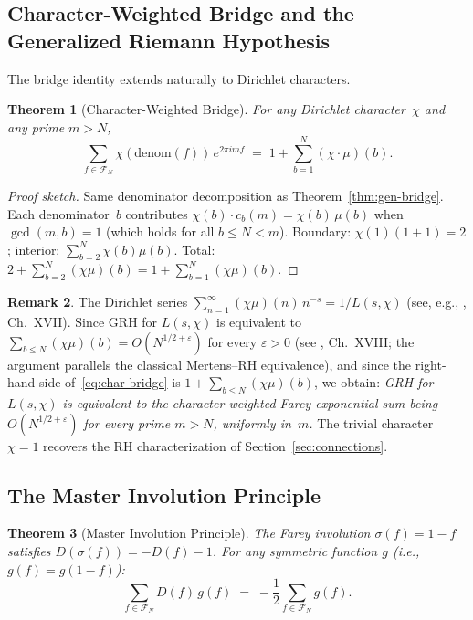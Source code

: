 \documentclass[11pt]{article}
\newtheorem{theorem}{Theorem}[section]
\theoremstyle{definition}
\newtheorem{remark}[theorem]{Remark}
\newcommand{\F}{\mathcal{F}}
\begin{document}
\subsection{Character-Weighted Bridge and the Generalized Riemann Hypothesis}

The bridge identity extends naturally to Dirichlet characters.

\begin{theorem}[Character-Weighted Bridge]\label{thm:char-bridge}
For any Dirichlet character~$\chi$ and any prime $m > N$,
\begin{equation}\label{eq:char-bridge}
  \sum_{f \in \F_N} \chi(\mathrm{denom}(f))\, e^{2\pi i m f}
  \;=\; 1 + \sum_{b=1}^{N} (\chi \cdot \mu)(b).
\end{equation}
\end{theorem}

\begin{proof}[Proof sketch]
Same denominator decomposition as Theorem~\ref{thm:gen-bridge}.
Each denominator~$b$ contributes $\chi(b) \cdot c_b(m) = \chi(b)\,\mu(b)$
when $\gcd(m,b)=1$ (which holds for all $b \le N < m$).
Boundary: $\chi(1)(1+1) = 2$; interior:
$\sum_{b=2}^{N}\chi(b)\mu(b)$.  Total:
$2 + \sum_{b=2}^{N}(\chi\mu)(b) = 1 + \sum_{b=1}^{N}(\chi\mu)(b)$.
\end{proof}

\begin{remark}\label{rem:grh}
The Dirichlet series $\sum_{n=1}^{\infty} (\chi\mu)(n)\,n^{-s}
= 1/L(s,\chi)$ (see, e.g., \cite{HardyWright2008}, Ch.~XVII).
Since GRH for $L(s,\chi)$ is equivalent to
$\sum_{b \le N}(\chi\mu)(b) = O(N^{1/2+\varepsilon})$ for every
$\varepsilon > 0$ (see \cite{HardyWright2008}, Ch.~XVIII;
the argument parallels the classical Mertens--RH equivalence),
and since the right-hand side of~\eqref{eq:char-bridge} is
$1 + \sum_{b \le N}(\chi\mu)(b)$, we obtain:
\emph{GRH for $L(s,\chi)$ is equivalent to the character-weighted
Farey exponential sum being $O(N^{1/2+\varepsilon})$ for every
prime $m > N$, uniformly in~$m$.}
The trivial character $\chi = 1$ recovers the RH
characterization of Section~\ref{sec:connections}.
\end{remark}

\subsection{The Master Involution Principle}

\begin{theorem}[Master Involution Principle]\label{thm:involution}
The Farey involution $\sigma(f) = 1 - f$ satisfies
$D(\sigma(f)) = -D(f) - 1$.  For any symmetric function $g$
(i.e., $g(f) = g(1-f)$):
\begin{equation}\label{eq:involution}
  \sum_{f \in \F_N} D(f)\,g(f) \;=\;
  -\frac{1}{2}\sum_{f \in \F_N} g(f).
\end{equation}
\end{theorem}
\end{document}

